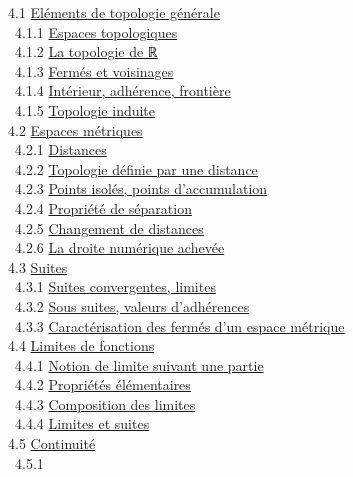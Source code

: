 \documentclass[]{article}
\begin{document}
~4.1 \href{coursse18.html\#x25-1250004.1}{Eléments de topologie
générale} \\ ~~4.1.1 \href{coursse18.html\#x25-1260004.1.1}{Espaces
topologiques} \\ ~~4.1.2 \href{coursse18.html\#x25-1270004.1.2}{La
topologie de ℝ} \\ ~~4.1.3 \href{coursse18.html\#x25-1280004.1.3}{Fermés
et voisinages} \\ ~~4.1.4
\href{coursse18.html\#x25-1290004.1.4}{Intérieur, adhérence, frontière}
\\ ~~4.1.5 \href{coursse18.html\#x25-1300004.1.5}{Topologie induite} \\
~4.2 \href{coursse19.html\#x26-1310004.2}{Espaces métriques} \\ ~~4.2.1
\href{coursse19.html\#x26-1320004.2.1}{Distances} \\ ~~4.2.2
\href{coursse19.html\#x26-1330004.2.2}{Topologie définie par une
distance} \\ ~~4.2.3 \href{coursse19.html\#x26-1340004.2.3}{Points
isolés, points d'accumulation} \\ ~~4.2.4
\href{coursse19.html\#x26-1350004.2.4}{Propriété de séparation} \\
~~4.2.5 \href{coursse19.html\#x26-1360004.2.5}{Changement de distances}
\\ ~~4.2.6 \href{coursse19.html\#x26-1370004.2.6}{La droite numérique
achevée} \\ ~4.3 \href{coursse20.html\#x27-1380004.3}{Suites} \\ ~~4.3.1
\href{coursse20.html\#x27-1390004.3.1}{Suites convergentes, limites} \\
~~4.3.2 \href{coursse20.html\#x27-1400004.3.2}{Sous suites, valeurs
d'adhérences} \\ ~~4.3.3
\href{coursse20.html\#x27-1410004.3.3}{Caractérisation des fermés d'un
espace métrique} \\ ~4.4 \href{coursse21.html\#x28-1420004.4}{Limites de
fonctions} \\ ~~4.4.1 \href{coursse21.html\#x28-1430004.4.1}{Notion de
limite suivant une partie} \\ ~~4.4.2
\href{coursse21.html\#x28-1440004.4.2}{Propriétés élémentaires} \\
~~4.4.3 \href{coursse21.html\#x28-1450004.4.3}{Composition des limites}
\\ ~~4.4.4 \href{coursse21.html\#x28-1460004.4.4}{Limites et suites} \\
~4.5 \href{coursse22.html\#x29-1470004.5}{Continuité} \\ ~~4.5.1
\end{document}
